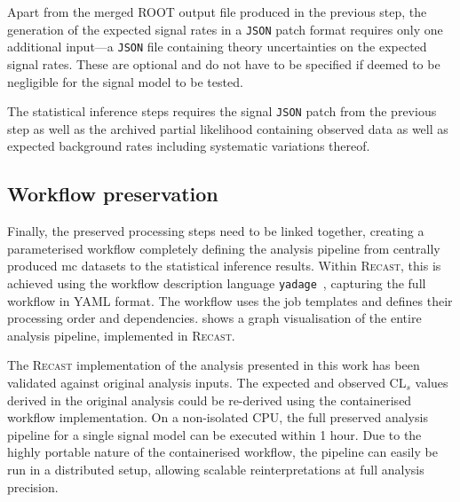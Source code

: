 Apart from the merged \textsc{ROOT} output file produced in the previous step, the generation of the expected signal rates in a \texttt{JSON} patch format requires only one additional input---a \texttt{JSON} file containing theory uncertainties on the expected signal rates. These are optional and do not have to be specified if deemed to be negligible for the signal model to be tested.

The statistical inference steps requires the signal \texttt{JSON} patch from the previous step as well as the archived partial likelihood containing observed data as well as expected background rates including systematic variations thereof. 

\subsection{Workflow preservation}

Finally, the preserved processing steps need to be linked together, creating a parameterised workflow completely defining the analysis pipeline from centrally produced \gls{mc} datasets to the statistical inference results. Within \textsc{Recast}, this is achieved using the workflow description language \texttt{yadage}~\cite{yadage:2017frf}, capturing the full workflow in YAML format. The workflow uses the job templates and defines their processing order and dependencies.  shows a graph visualisation of the entire analysis pipeline, implemented in \textsc{Recast}. 

The \textsc{Recast} implementation of the analysis presented in this work has been validated against original analysis inputs. The expected and observed CL$_s$ values derived in the original analysis could be re-derived using the containerised workflow implementation. On a non-isolated CPU, the full preserved analysis pipeline for a single signal model can be executed within 1 hour. Due to the highly portable nature of the containerised workflow, the pipeline can easily be run in a distributed setup, allowing scalable reinterpretations at full analysis precision. 


